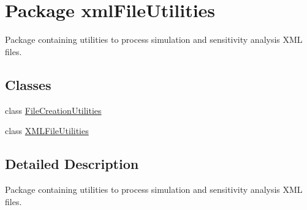 \hypertarget{namespacexmlFileUtilities}{}\section{Package xml\+File\+Utilities}
\label{namespacexmlFileUtilities}


Package containing utilities to process simulation and sensitivity analysis X\+M\+L files.  


\subsection*{Classes}
\begin{DoxyCompactItemize}
\item 
class \hyperlink{classxmlFileUtilities_1_1FileCreationUtilities}{File\+Creation\+Utilities}
\item 
class \hyperlink{classxmlFileUtilities_1_1XMLFileUtilities}{X\+M\+L\+File\+Utilities}
\end{DoxyCompactItemize}


\subsection{Detailed Description}
Package containing utilities to process simulation and sensitivity analysis X\+M\+L files. 